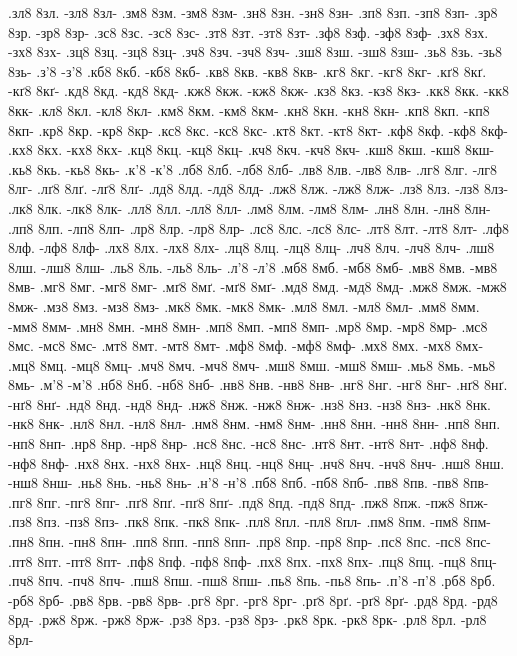 {.зл8 8зл. -зл8 8зл-
.зм8 8зм. -зм8 8зм-
.зн8 8зн. -зн8 8зн-
.зп8 8зп. -зп8 8зп-
.зр8 8зр. -зр8 8зр-
.зс8 8зс. -зс8 8зс-
.зт8 8зт. -зт8 8зт-
.зф8 8зф. -зф8 8зф-
.зх8 8зх. -зх8 8зх-
.зц8 8зц. -зц8 8зц-
.зч8 8зч. -зч8 8зч-
.зш8 8зш. -зш8 8зш-
.зь8 8зь. -зь8 8зь-
.з'8 -з'8
.кб8 8кб. -кб8 8кб-
.кв8 8кв. -кв8 8кв-
.кг8 8кг. -кг8 8кг-
.кґ8 8кґ. -кґ8 8кґ-
.кд8 8кд. -кд8 8кд-
.кж8 8кж. -кж8 8кж-
.кз8 8кз. -кз8 8кз-
.кк8 8кк. -кк8 8кк-
.кл8 8кл. -кл8 8кл-
.км8 8км. -км8 8км-
.кн8 8кн. -кн8 8кн-
.кп8 8кп. -кп8 8кп-
.кр8 8кр. -кр8 8кр-
.кс8 8кс. -кс8 8кс-
.кт8 8кт. -кт8 8кт-
.кф8 8кф. -кф8 8кф-
.кх8 8кх. -кх8 8кх-
.кц8 8кц. -кц8 8кц-
.кч8 8кч. -кч8 8кч-
.кш8 8кш. -кш8 8кш-
.кь8 8кь. -кь8 8кь-
.к'8 -к'8
.лб8 8лб. -лб8 8лб-
.лв8 8лв. -лв8 8лв-
.лг8 8лг. -лг8 8лг-
.лґ8 8лґ. -лґ8 8лґ-
.лд8 8лд. -лд8 8лд-
.лж8 8лж. -лж8 8лж-
.лз8 8лз. -лз8 8лз-
.лк8 8лк. -лк8 8лк-
.лл8 8лл. -лл8 8лл-
.лм8 8лм. -лм8 8лм-
.лн8 8лн. -лн8 8лн-
.лп8 8лп. -лп8 8лп-
.лр8 8лр. -лр8 8лр-
.лс8 8лс. -лс8 8лс-
.лт8 8лт. -лт8 8лт-
.лф8 8лф. -лф8 8лф-
.лх8 8лх. -лх8 8лх-
.лц8 8лц. -лц8 8лц-
.лч8 8лч. -лч8 8лч-
.лш8 8лш. -лш8 8лш-
.ль8 8ль. -ль8 8ль-
.л'8 -л'8
.мб8 8мб. -мб8 8мб-
.мв8 8мв. -мв8 8мв-
.мг8 8мг. -мг8 8мг-
.мґ8 8мґ. -мґ8 8мґ-
.мд8 8мд. -мд8 8мд-
.мж8 8мж. -мж8 8мж-
.мз8 8мз. -мз8 8мз-
.мк8 8мк. -мк8 8мк-
.мл8 8мл. -мл8 8мл-
.мм8 8мм. -мм8 8мм-
.мн8 8мн. -мн8 8мн-
.мп8 8мп. -мп8 8мп-
.мр8 8мр. -мр8 8мр-
.мс8 8мс. -мс8 8мс-
.мт8 8мт. -мт8 8мт-
.мф8 8мф. -мф8 8мф-
.мх8 8мх. -мх8 8мх-
.мц8 8мц. -мц8 8мц-
.мч8 8мч. -мч8 8мч-
.мш8 8мш. -мш8 8мш-
.мь8 8мь. -мь8 8мь-
.м'8 -м'8
.нб8 8нб. -нб8 8нб-
.нв8 8нв. -нв8 8нв-
.нг8 8нг. -нг8 8нг-
.нґ8 8нґ. -нґ8 8нґ-
.нд8 8нд. -нд8 8нд-
.нж8 8нж. -нж8 8нж-
.нз8 8нз. -нз8 8нз-
.нк8 8нк. -нк8 8нк-
.нл8 8нл. -нл8 8нл-
.нм8 8нм. -нм8 8нм-
.нн8 8нн. -нн8 8нн-
.нп8 8нп. -нп8 8нп-
.нр8 8нр. -нр8 8нр-
.нс8 8нс. -нс8 8нс-
.нт8 8нт. -нт8 8нт-
.нф8 8нф. -нф8 8нф-
.нх8 8нх. -нх8 8нх-
.нц8 8нц. -нц8 8нц-
.нч8 8нч. -нч8 8нч-
.нш8 8нш. -нш8 8нш-
.нь8 8нь. -нь8 8нь-
.н'8 -н'8
.пб8 8пб. -пб8 8пб-
.пв8 8пв. -пв8 8пв-
.пг8 8пг. -пг8 8пг-
.пґ8 8пґ. -пґ8 8пґ-
.пд8 8пд. -пд8 8пд-
.пж8 8пж. -пж8 8пж-
.пз8 8пз. -пз8 8пз-
.пк8 8пк. -пк8 8пк-
.пл8 8пл. -пл8 8пл-
.пм8 8пм. -пм8 8пм-
.пн8 8пн. -пн8 8пн-
.пп8 8пп. -пп8 8пп-
.пр8 8пр. -пр8 8пр-
.пс8 8пс. -пс8 8пс-
.пт8 8пт. -пт8 8пт-
.пф8 8пф. -пф8 8пф-
.пх8 8пх. -пх8 8пх-
.пц8 8пц. -пц8 8пц-
.пч8 8пч. -пч8 8пч-
.пш8 8пш. -пш8 8пш-
.пь8 8пь. -пь8 8пь-
.п'8 -п'8
.рб8 8рб. -рб8 8рб-
.рв8 8рв. -рв8 8рв-
.рг8 8рг. -рг8 8рг-
.рґ8 8рґ. -рґ8 8рґ-
.рд8 8рд. -рд8 8рд-
.рж8 8рж. -рж8 8рж-
.рз8 8рз. -рз8 8рз-
.рк8 8рк. -рк8 8рк-
.рл8 8рл. -рл8 8рл-
}
